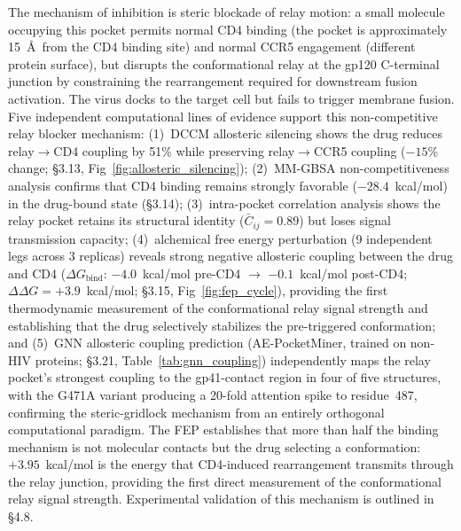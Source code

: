 \documentclass[11pt,a4paper]{article}
\begin{document}
The mechanism of inhibition is steric blockade of relay motion: a small molecule occupying this pocket permits normal CD4 binding (the pocket is approximately 15~\AA\ from the CD4 binding site) and normal CCR5 engagement (different protein surface), but disrupts the conformational relay at the gp120 C-terminal junction by constraining the rearrangement required for downstream fusion activation. The virus docks to the target cell but fails to trigger membrane fusion. Five independent computational lines of evidence support this non-competitive relay blocker mechanism: (1)~DCCM allosteric silencing shows the drug reduces relay$\to$CD4 coupling by 51\% while preserving relay$\to$CCR5 coupling ($-15$\% change; \S3.13, Fig~\ref{fig:allosteric_silencing}); (2)~MM-GBSA non-competitiveness analysis confirms that CD4 binding remains strongly favorable ($-28.4$~kcal/mol) in the drug-bound state (\S3.14); (3)~intra-pocket correlation analysis shows the relay pocket retains its structural identity ($\bar{C}_{ij} = 0.89$) but loses signal transmission capacity; (4)~alchemical free energy perturbation (9 independent legs across 3 replicas) reveals strong negative allosteric coupling between the drug and CD4 ($\Delta G_\mathrm{bind}$: $-4.0$~kcal/mol pre-CD4 $\to$ $-0.1$~kcal/mol post-CD4; $\Delta\Delta G = +3.9$~kcal/mol; \S3.15, Fig~\ref{fig:fep_cycle}), providing the first thermodynamic measurement of the conformational relay signal strength and establishing that the drug selectively stabilizes the pre-triggered conformation; and (5)~GNN allosteric coupling prediction (AE-PocketMiner, trained on non-HIV proteins; \S3.21, Table~\ref{tab:gnn_coupling}) independently maps the relay pocket's strongest coupling to the gp41-contact region in four of five structures, with the G471A variant producing a 20-fold attention spike to residue~487, confirming the steric-gridlock mechanism from an entirely orthogonal computational paradigm. The FEP establishes that more than half the binding mechanism is not molecular contacts but the drug selecting a conformation: $+3.95$~kcal/mol is the energy that CD4-induced rearrangement transmits through the relay junction, providing the first direct measurement of the conformational relay signal strength. Experimental validation of this mechanism is outlined in \S4.8.
\end{document}

